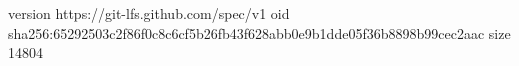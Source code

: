 version https://git-lfs.github.com/spec/v1
oid sha256:65292503c2f86f0c8c6cf5b26fb43f628abb0e9b1dde05f36b8898b99cec2aac
size 14804
